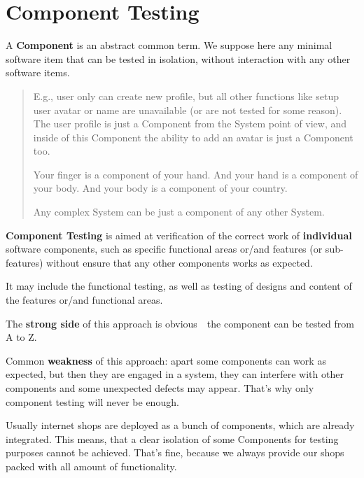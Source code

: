 \section{Component Testing}
\label{sec:Component Testing}

A \textbf{Component} is an abstract common term. We suppose here any minimal software item that can be tested in isolation, without interaction with any other software items.

\begin{quote}
E.g., user only can create new profile, but all other functions like setup user avatar or name are unavailable (or are not tested for some reason). The user profile is just a Component from the System point of view, and inside of this Component the ability to add an avatar is just a Component too.

Your finger is a component of your hand. And your hand is a component of your body. And your body is a component of your country. 

Any complex System can be just a component of any other System.\end{quote} 

\textbf{Component Testing} is aimed at verification of the correct work of \textbf{individual} software components, such as specific functional areas or/and features (or sub-features) without ensure that any other components works as expected.

It may include the functional testing, as well as testing of designs and content of the features or/and functional areas.

The \textbf{strong side} of this approach is obvious~\textemdash~the component can be tested from A to Z.

Common \textbf{weakness} of this approach: apart some components can work as expected, but then they are engaged in a system, they can interfere with other components and some unexpected defects may appear. That's why only component testing will never be enough.

Usually internet shops are deployed as a bunch of components, which are already integrated. This means, that a clear isolation of some Components for testing purposes cannot be achieved. That's fine, because we always provide our shops packed with all amount of functionality.
